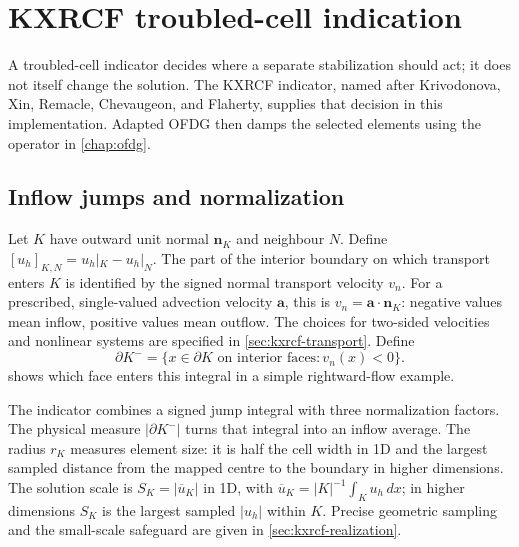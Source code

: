 \section{KXRCF troubled-cell indication}
\label{chap:kxrcf}
A troubled-cell indicator decides where a separate stabilization should act;
it does not itself change the solution. The KXRCF indicator, named after
Krivodonova, Xin, Remacle, Chevaugeon, and Flaherty, supplies that decision in
this implementation. Adapted OFDG then damps the selected elements using the
operator in \cref{chap:ofdg}.


\subsection{Inflow jumps and normalization}
Let $K$ have outward unit normal $\boldsymbol n_K$ and neighbour $N$. Define
$[u_h]_{K,N}=u_h|_K-u_h|_N$. The part of the interior boundary on which
transport enters $K$ is identified by the signed normal transport velocity
$v_n$. For a prescribed, single-valued advection velocity $\boldsymbol a$,
this is $v_n=\boldsymbol a\cdot\boldsymbol n_K$: negative values mean inflow,
positive values mean outflow. The choices for two-sided velocities and
nonlinear systems are specified in \cref{sec:kxrcf-transport}. Define
\begin{equation}
 \partial K^- =\{x\in\partial K\text{ on interior faces}:
                         v_n(x)<0\}.
 \label{eq:kxrcf-inflow}
\end{equation}
 shows which face enters this integral in a simple
rightward-flow example.


The indicator combines a signed jump integral with three normalization
factors. The physical measure $|\partial K^-|$ turns that integral into an
inflow average. The radius $r_K$ measures element size: it is half the cell
width in 1D and the largest sampled distance from the mapped centre to the
boundary in higher dimensions. The solution scale is
$S_K=|\overline u_K|$ in 1D, with
$\overline u_K=|K|^{-1}\int_Ku_h\,dx$; in higher dimensions $S_K$ is the
largest sampled $|u_h|$ within $K$. Precise geometric sampling and the
small-scale safeguard are given in \cref{sec:kxrcf-realization}.

